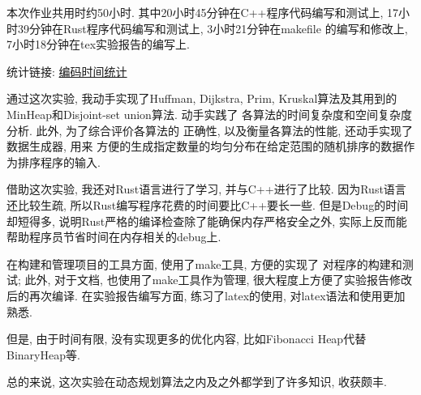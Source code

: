 \label{ssub:实验心得}
本次作业共用时约50小时. 其中20小时45分钟在C++程序代码编写和测试上,
17小时39分钟在Rust程序代码编写和测试上, 3小时21分钟在makefile
的编写和修改上, 7小时18分钟在tex实验报告的编写上.\par
统计链接: \href{https://wakatime.com/@micuks/projects/uemupyroug?start=2022-11-26&end=2022-12-02}{编码时间统计}

通过这次实验, 我动手实现了Huffman, Dijkstra, Prim,
Kruskal算法及其用到的MinHeap和Disjoint-set union算法. 动手实践了
各算法的时间复杂度和空间复杂度分析. 此外, 为了综合评价各算法的
正确性, 以及衡量各算法的性能, 还动手实现了数据生成器, 用来
方便的生成指定数量的均匀分布在给定范围的随机排序的数据作为排序程序的输入.\par

借助这次实验, 我还对Rust语言进行了学习, 并与C++进行了比较.
因为Rust语言还比较生疏, 所以Rust编写程序花费的时间要比C++要长一些.
但是Debug的时间却短得多, 说明Rust严格的编译检查除了能确保内存严格安全之外,
实际上反而能帮助程序员节省时间在内存相关的debug上.\par

在构建和管理项目的工具方面, 使用了make工具, 方便的实现了
对程序的构建和测试; 此外, 对于文档, 也使用了make工具作为管理,
很大程度上方便了实验报告修改后的再次编译. 在实验报告编写方面,
练习了latex的使用, 对latex语法和使用更加熟悉.\par

但是, 由于时间有限, 没有实现更多的优化内容, 比如Fibonacci Heap代替BinaryHeap等.\par

总的来说, 这次实验在动态规划算法之内及之外都学到了许多知识, 收获颇丰.
